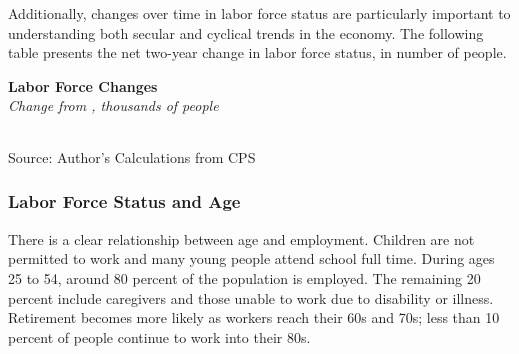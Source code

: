 \documentclass{report}
\begin{document}
{\begin{minipage}{0.76\textwidth}
\small Additionally, changes over time in labor force status are particularly important to understanding both secular and cyclical trends in the economy. The following table presents the net two-year change in labor force status, in number of people.
\vspace{2mm}

\normalsize \textbf{Labor Force Changes}\\
\footnotesize{\textit{Change from \unskip, thousands of people}}\\
\noindent {} \setlength{\tabcolsep}{3.0pt} \color{black!90}
		{\renewcommand{\arraystretch}{1.52}
		 \begin{tabular}{p{27.8mm} R{11.2mm} R{10.4mm} R{10.4mm} R{10.2mm} 
		 				 R{10.6mm} R{10.4mm} R{10.4mm}}
			  \hline
		\end{tabular}}
		\vspace{-2mm}
		
\footnotesize{Source: Author's Calculations from CPS}
\end{minipage}
\newpage
\begin{minipage}{0.76\textwidth}
\subsubsection*{Labor Force Status and Age}
\small There is a clear relationship between age and employment. Children are not permitted to work and many young people attend school full time. During ages 25 to 54, around 80 percent of the population is employed. The remaining 20 percent include caregivers and those unable to work due to disability or illness. Retirement becomes more likely as workers reach their 60s and 70s; less than 10 percent of people continue to work into their 80s. 
\vspace{1mm}


\end{minipage}}
\end{document}
